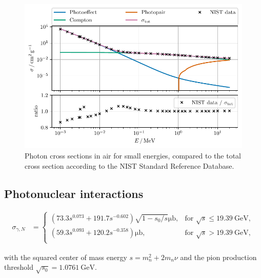 \begin{figure}
	\centering
    \includegraphics{plots/photoeffect_nist.pdf}
    \caption{Photon cross sections in air for small energies, compared to the total cross section according to the NIST Standard Reference Database.}
    \label{fig:photoeffect_nist}
\end{figure}

\subsection{Photonuclear interactions}


\begin{align}
	\label{eqn:photonuclear_C7}
	\sigma_{\gamma,N} &=
	\begin{cases}
		\left(73.3 s^{0.073} + 191.7 s^{-0.602} \right) \sqrt{1 - s_0 / s} \si{\micro\barn}, & \text{for } \sqrt{s} \leq \SI{19.39}{\giga\electronvolt}, \\
		\left( 59.3 s^{0.093} + 120.2 s^{-0.358} \right) \si{\micro\barn}, & \text{for } \sqrt{s} > \SI{19.39}{\giga\electronvolt}, \\
	\end{cases}
\end{align} 

with the squared center of mass energy $s = m_n^2 + 2 m_n \nu$ and the pion production threshold $\sqrt{s_0} = \SI{1.0761}{\giga\electronvolt}$.


